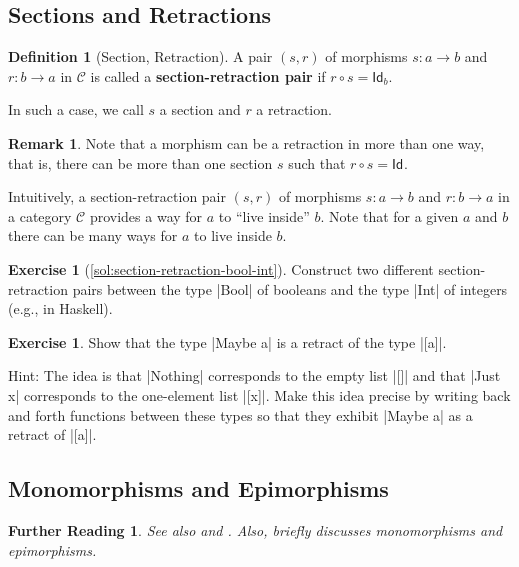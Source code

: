 \documentclass[a4paper,10pt]{scrartcl}
\theoremstyle{plain}
\newtheorem*{reading*}{Further Reading}
\theoremstyle{definition}
\newtheorem{rem}[thm]{Remark}
\newtheorem{dfn}[thm]{Definition}
\newtheorem{exer}[thm]{Exercise}
\newcommand{\cfont}[1]{\ensuremath{\mathsf{#1}}}
\newcommand{\Cat}[1]{\mathcal{#1}}
\newcommand{\CC}{\Cat{C}}
\newcommand{\Id}[1][]{\cfont{Id}_{#1}}
\newcommand{\co}[2]{\ensuremath{#2 \circ #1}}
\begin{document}
\subsection{Sections and Retractions}
\label{sec:sections}


\begin{dfn}[Section, Retraction]
  A pair $(s,r)$ of morphisms $s : a \to b$ and $r : b \to a$ in $\CC$ is called a \textbf{section-retraction pair} if $\co{s}{r} = \Id[b]$.

  In such a case, we call $s$ a section and $r$ a retraction.
\end{dfn}

\begin{rem}
  Note that a morphism can be a retraction in more than one way, that is, there can be more than one section $s$ such that $\co{s}{r} = \Id$.
\end{rem}

Intuitively, a section-retraction pair $(s,r)$ of morphisms $s : a \to b$ and $r : b \to a$ in a category $\CC$ provides a way for $a$ to ``live inside'' $b$.
Note that for a given $a$ and $b$ there can be many ways for $a$ to live inside $b$.

\begin{exer}[\cref{sol:section-retraction-bool-int}]\label{exer:section-retraction-bool-int}
  Construct two different section-retraction pairs between the type |Bool| of booleans and the type |Int| of integers (e.g., in Haskell).
\end{exer}



\begin{exer}
 Show that the type |Maybe a| is a retract of the type |[a]|. 
 
 Hint: The idea is that |Nothing| corresponds to the empty list |[]| and that |Just x| corresponds to the one-element list |[x]|. Make this idea precise by writing back and forth functions between these types so that they exhibit |Maybe a| as a retract of |[a]|. 
\end{exer}


\subsection{Monomorphisms and Epimorphisms}
\label{sec:mono-epi}

\begin{reading*}
See also \cite[p. 134]{leinster} and \cite[\S\S 2.8--2.9]{barr-wells}.
Also, \cite[\S 2.2]{pierce} briefly discusses monomorphisms and epimorphisms.
\end{reading*}
\end{document}

